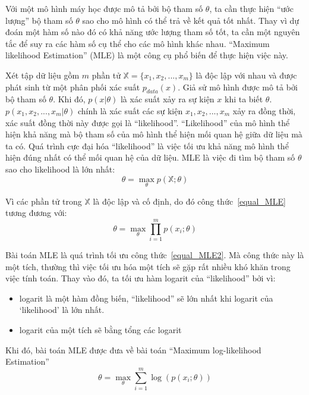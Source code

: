         Với một mô hình máy học được mô tả bởi bộ tham số $\theta$, ta cần thực hiện ``ước lượng''
        bộ tham số $\theta$ sao cho mô hình có thể trả về kết quả tốt nhất. 
        Thay vì dự đoán một hàm số nào đó có khả năng ước lượng tham số tốt, ta cần một nguyên tắc để suy ra các hàm số cụ thể 
        cho các mô hình khác nhau.
        ``Maximum likelihood Estimation'' (MLE) là một công cụ phổ biến để thực hiện việc này.
        
        Xét tập dữ liệu gồm $m$ phần tử $\mathbb{X} = \{x_1,x_2,...,x_m\}$ là độc lập với nhau và được phát sinh từ một phân phối xác suất $p_{data}(x)$.
        Giả sử mô hình được mô tả bởi bộ tham số $\theta$. Khi đó, $p(x|\theta)$ là xác suất xảy ra sự kiện $x$ khi ta biết $\theta$.
        $p(x_1,x_2,...,x_m|\theta)$ chính là xác suất các sự kiện $x_1,x_2,...,x_m$ xảy ra đồng thời, xác suất đồng thời này được gọi là ``likelihood''.
        ``Likelihood'' của mô hình thể hiện khả năng mà bộ tham số của mô hình thể hiện mối quan hệ giữa dữ liệu mà ta có.
        Quá trình cực đại hóa ``likelihood'' là việc tối ưu khả năng mô hình thể hiện đúng nhất có thể mối quan hệ của dữ liệu.
        MLE là việc đi tìm bộ tham số $\theta$ sao cho likelihood là lớn nhất:
        \begin{equation}
        \label{equal_MLE}
                \theta = \max_{\theta} p(\mathbb{X};\theta)
        \end{equation} 
        
        Vì các phần tử trong $\mathbb{X}$ là độc lập và cố định, do đó công thức~\ref{equal_MLE} tương đương với:
        \begin{equation}
        \label{equal_MLE2}
            \theta = \max_{\theta} \prod_{i=1}^m p(x_i;\theta)
        \end{equation}        
        
        Bài toán MLE là quá trình tối ưu công thức~\ref{equal_MLE2}. Mà công thức này là một tích, thường thì việc tối ưu hóa một tích sẽ gặp rất nhiều khó khăn
        trong việc tính toán.
        Thay vào đó, ta tối ưu hàm logarit của ``likelihood'' bởi vì:
        \begin{itemize}
            \item logarit là một hàm đồng biến, ``likelihood'' sẽ lớn nhất khi logarit của `likelihood' là lớn nhất.
            \item logarit của một tích sẽ bằng tổng các logarit
        \end{itemize}
        Khi đó, bài toán MLE được đưa về bài toán ``Maximum log-likelihood Estimation''
        \begin{equation}
        \label{equal_loglikelihood}
            \theta = \max_{\theta} \sum_{i=1}^m \log(p(x_i;\theta))
        \end{equation}
        

